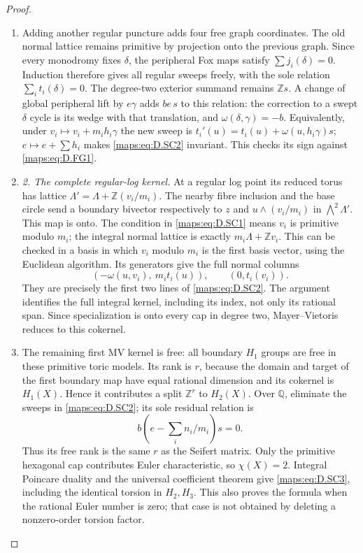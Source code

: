\begin{proof}
\begin{enumerate}[label=\arabic*.,leftmargin=*]
\item Adding another regular puncture adds four free graph coordinates.
The old normal lattice remains primitive by projection onto the
previous graph. Since every monodromy fixes $\delta$, the peripheral
Fox maps satisfy $\sum j_i(\delta)=0$. Induction therefore gives
all regular sweeps freely, with the sole relation
$\sum_i t_i(\delta)=0$. The degree-two exterior summand remains
$\mathbb Zs$. A change of global peripheral lift by $e\gamma$
adds $be\,s$ to this relation: the correction to a swept $\delta$
cycle is its wedge with that translation, and
$\omega(\delta,\gamma)=-b$. Equivalently, under
$v_i\mapsto v_i+m_i h_i\gamma$ the new sweep is
$t_i'(u)=t_i(u)+\omega(u,h_i\gamma)s$;
$e\mapsto e+\sum h_i$ makes \eqref{maps:eq:D.SC2} invariant. This checks its
sign against \eqref{maps:eq:D.FG1}.

\item \emph{2. The complete regular-log kernel.}
At a regular log point its reduced torus has lattice
$\Lambda'=\Lambda+\mathbb Z(v_i/m_i)$. The nearby fibre inclusion
and the base circle send a boundary bivector respectively to
$z$ and $u\wedge(v_i/m_i)$ in $\bigwedge^2\Lambda'$.
This map is onto. The condition in \eqref{maps:eq:D.SC1} means $v_i$ is primitive
modulo $m_i$; the integral normal lattice is exactly
$m_i\Lambda+\mathbb Z v_i$. This can be checked in a basis in which
$v_i$ modulo $m_i$ is the first basis vector, using the Euclidean
algorithm. Its generators give the full normal columns
\[
 (-\omega(u,v_i),\ m_it_i(u)),\qquad (0,t_i(v_i)).
\]
They are precisely the first two lines of \eqref{maps:eq:D.SC2}. The argument
identifies the full integral kernel, including its index, not only
its rational span. Since specialization is onto every cap in degree
two, Mayer--Vietoris reduces to this cokernel.

\item The remaining first MV kernel is free: all boundary $H_1$ groups
are free in these primitive toric models. Its rank is $r$, because
the domain and target of the first boundary map have equal rational
dimension and its cokernel is $H_1(X)$. Hence it contributes a
split $\mathbb Z^r$ to $H_2(X)$. Over $\mathbb Q$, eliminate the
sweeps in \eqref{maps:eq:D.SC2}; its sole residual relation is
\[
                 b\left(e-\sum_i n_i/m_i\right)s=0.
\]
Thus its free rank is the same $r$ as the Seifert matrix.
Only the primitive hexagonal cap contributes Euler characteristic,
so $\chi(X)=2$. Integral Poincare duality and the universal coefficient
theorem give \eqref{maps:eq:D.SC3}, including the identical torsion in $H_2,H_3$.
This also proves the formula when the rational Euler number is zero;
that case is not obtained by deleting a nonzero-order torsion factor.


\end{enumerate}
\end{proof}
